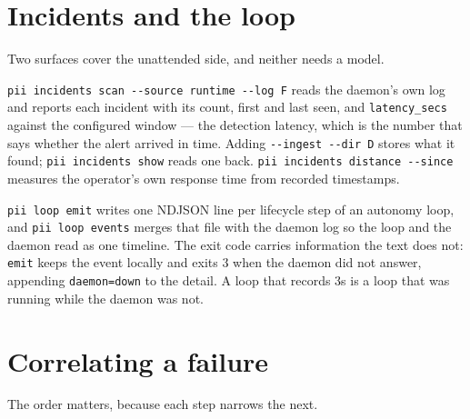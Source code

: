 \section{Incidents and the loop}

Two surfaces cover the unattended side, and neither needs a model.

\texttt{pii incidents scan -{}-source runtime -{}-log F} reads the daemon's own log and reports
each incident with its count, first and last seen, and \texttt{latency\_secs} against the
configured window --- the detection latency, which is the number that says whether the alert
arrived in time. Adding \texttt{-{}-ingest -{}-dir D} stores what it found;
\texttt{pii incidents show} reads one back. \texttt{pii incidents distance -{}-since} measures
the operator's own response time from recorded timestamps.

\texttt{pii loop emit} writes one NDJSON line per lifecycle step of an autonomy loop, and
\texttt{pii loop events} merges that file with the daemon log so the loop and the daemon read
as one timeline. The exit code carries information the text does not: \texttt{emit} keeps the
event locally and exits 3 when the daemon did not answer, appending \texttt{daemon=down} to
the detail. A loop that records 3s is a loop that was running while the daemon was not.

\section{Correlating a failure}

The order matters, because each step narrows the next.

\begin{center}
\begin{minipage}{\linewidth}
\centering
{}
\end{minipage}
\end{center}

